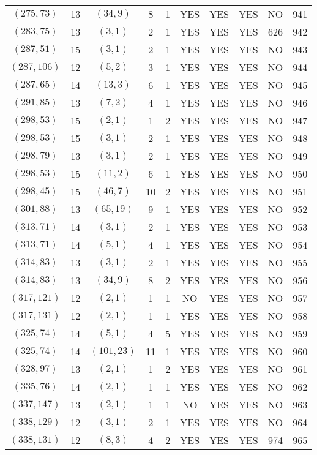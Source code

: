 \begin{longtable}{|c|c|c|c|c|c|c|c|c|c|}
$(275, 73)$ & 13 & $(34, 9)$ & 8 & 1 & YES & YES & YES & NO & 941\\
$(283, 75)$ & 13 & $(3, 1)$ & 2 & 1 & YES & YES & YES & 626 & 942\\
$(287, 51)$ & 15 & $(3, 1)$ & 2 & 1 & YES & YES & YES & NO & 943\\
$(287, 106)$ & 12 & $(5, 2)$ & 3 & 1 & YES & YES & YES & NO & 944\\
$(287, 65)$ & 14 & $(13, 3)$ & 6 & 1 & YES & YES & YES & NO & 945\\
$(291, 85)$ & 13 & $(7, 2)$ & 4 & 1 & YES & YES & YES & NO & 946\\
$(298, 53)$ & 15 & $(2, 1)$ & 1 & 2 & YES & YES & YES & NO & 947\\
$(298, 53)$ & 15 & $(3, 1)$ & 2 & 1 & YES & YES & YES & NO & 948\\
$(298, 79)$ & 13 & $(3, 1)$ & 2 & 1 & YES & YES & YES & NO & 949\\
$(298, 53)$ & 15 & $(11, 2)$ & 6 & 1 & YES & YES & YES & NO & 950\\
$(298, 45)$ & 15 & $(46, 7)$ & 10 & 2 & YES & YES & YES & NO & 951\\
$(301, 88)$ & 13 & $(65, 19)$ & 9 & 1 & YES & YES & YES & NO & 952\\
$(313, 71)$ & 14 & $(3, 1)$ & 2 & 1 & YES & YES & YES & NO & 953\\
$(313, 71)$ & 14 & $(5, 1)$ & 4 & 1 & YES & YES & YES & NO & 954\\
$(314, 83)$ & 13 & $(3, 1)$ & 2 & 1 & YES & YES & YES & NO & 955\\
$(314, 83)$ & 13 & $(34, 9)$ & 8 & 2 & YES & YES & YES & NO & 956\\
$(317, 121)$ & 12 & $(2, 1)$ & 1 & 1 & NO & YES & YES & NO & 957\\
$(317, 131)$ & 12 & $(2, 1)$ & 1 & 1 & YES & YES & YES & NO & 958\\
$(325, 74)$ & 14 & $(5, 1)$ & 4 & 5 & YES & YES & YES & NO & 959\\
$(325, 74)$ & 14 & $(101, 23)$ & 11 & 1 & YES & YES & YES & NO & 960\\
$(328, 97)$ & 13 & $(2, 1)$ & 1 & 2 & YES & YES & YES & NO & 961\\
$(335, 76)$ & 14 & $(2, 1)$ & 1 & 1 & YES & YES & YES & NO & 962\\
$(337, 147)$ & 13 & $(2, 1)$ & 1 & 1 & NO & YES & YES & NO & 963\\
$(338, 129)$ & 12 & $(3, 1)$ & 2 & 1 & YES & YES & YES & NO & 964\\
$(338, 131)$ & 12 & $(8, 3)$ & 4 & 2 & YES & YES & YES & 974 & 965\\

\end{longtable}
